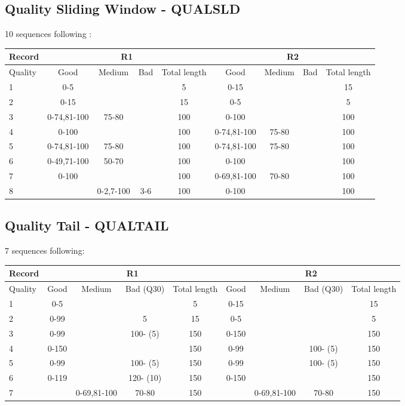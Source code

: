 \documentclass{article}
\begin{document}
\subsection{Quality Sliding Window - QUALSLD}
10 sequences following :
\begin{table}[H]
\begin{tabular}{|l|c|c|c|c|c|c|c|c|} \hline
    \textbf{Record} & \multicolumn{4}{c|}{R1} & \multicolumn{4}{c|}{R2} \\ \hline
    Quality & Good & Medium & Bad & Total length & Good & Medium & Bad & Total length\\ \hline
    1 & 0-5 & & & 5 & 0-15 & & & 15 \\ \hline
    2 & 0-15 & & & 15 & 0-5 & & & 5 \\ \hline
    3 & 0-74,81-100 & 75-80 & & 100 & 0-100 & & & 100 \\ \hline
    4 & 0-100 & & & 100 & 0-74,81-100 & 75-80 & & 100 \\ \hline
    5 & 0-74,81-100 & 75-80 & & 100 & 0-74,81-100 & 75-80 & & 100 \\ \hline
    6 & 0-49,71-100 & 50-70 & & 100 & 0-100 & & & 100 \\ \hline
    7 & 0-100 & & & 100 & 0-69,81-100 & 70-80 & & 100 \\ \hline
    8 & & 0-2,7-100 & 3-6 & 100 & 0-100 & & & 100 \\ \hline
\end{tabular}
\end{table}

\subsection{Quality Tail - QUALTAIL}
7 sequences following:
\begin{table}[H]
\begin{tabular}{|l|c|c|c|c|c|c|c|c|} \hline
    \textbf{Record} & \multicolumn{4}{c|}{R1} & \multicolumn{4}{c|}{R2} \\ \hline
    Quality & Good & Medium & Bad (Q30) & Total length & Good & Medium & Bad (Q30) & Total length\\ \hline
    1 & 0-5 & & & 5 & 0-15 & & & 15 \\ \hline
    2 & 0-99 & & 5 & 15 & 0-5 & & & 5 \\ \hline
    3 & 0-99 & & 100- (5) & 150 & 0-150 & & & 150 \\ \hline
    4 & 0-150 & & & 150 & 0-99 & & 100- (5) & 150 \\ \hline
    5 & 0-99 & & 100- (5) & 150 & 0-99 & & 100- (5) & 150 \\ \hline
    6 & 0-119 & & 120- (10) & 150 & 0-150 & & & 150 \\ \hline
    7 & & 0-69,81-100 & 70-80 & 150 & & 0-69,81-100 & 70-80 & 150 \\ \hline
\end{tabular}
\end{table}
\end{document}
